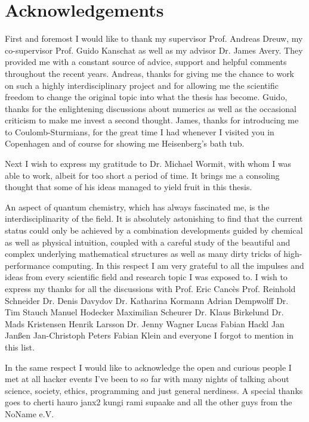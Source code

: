 \chapter*{Acknowledgements} 
{}

First and foremost I would like to thank
my supervisor Prof. Andreas Dreuw,
my co-supervisor Prof. Guido Kanschat
as well as my advisor Dr. James Avery.
They provided me with a constant source of advice, support
and helpful comments throughout the recent years.
Andreas, thanks for giving me the chance to work on such
a highly interdisciplinary project
and for allowing me the scientific freedom
to change the original topic into what the thesis has become.
Guido, thanks for the enlightening discussions about numerics
as well as the occasional criticism to make me invest a second thought.
James, thanks for introducing me to Coulomb-Sturmians,
for the great time I had whenever I visited you in Copenhagen
and of course for showing me Heisenberg's bath tub.

Next I wish to express my gratitude to Dr. Michael Wormit,
with whom I was able to work,
albeit for too short a period of time.
It brings me a consoling thought that some of his
ideas managed to yield fruit in this thesis.


An aspect of quantum chemistry,
which has always fascinated me,
is the interdisciplinarity of the field.
It is absolutely astonishing
to find that the current status could only be achieved
by a combination developments guided by chemical as well as physical intuition,
coupled with a careful study of the beautiful and complex
underlying mathematical structures
as well as many dirty tricks of high-performance computing.
In this respect I am very grateful
to all the impulses and ideas from
every scientific field and research topic I was exposed to.
I wish to express my thanks for all the discussions with
Prof. Eric Cancès
Prof. Reinhold Schneider
Dr. Denis Davydov
Dr. Katharina Kormann
%
Adrian Dempwolff
Dr. Tim Stauch
Manuel Hodecker
Maximilian Scheurer
%
Dr. Klaus Birkelund
Dr. Mads Kristensen
%
Henrik Larsson
Dr. Jenny Wagner
Lucas Fabian Hackl
Jan Janßen
Jan-Christoph Peters
Fabian Klein
and everyone I forgot to mention in this list.


In the same respect I would like to acknowledge the open and curious
people I met at all hacker events I've been to so far
with many nights of talking
about science, society, ethics, programming and just general nerdiness.
A special thanks goes to 
cherti
hauro
janx2
kungi
rami
supaake
and all the other guys from the NoName e.V.

